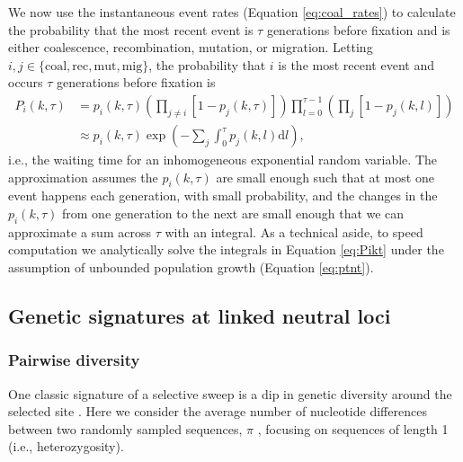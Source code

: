 \documentclass[]{article}
\begin{document}
We now use the instantaneous event rates (Equation \ref{eq:coal_rates}) to calculate the probability that the most recent event is $\tau$ generations before fixation and is either coalescence, recombination, mutation, or migration. 
Letting $i,j\in\{\mathrm{coal, rec, mut, mig}\}$, the probability that $i$ is the most recent event and occurs $\tau$ generations before fixation is \citep[c.f., equation 6 in][]{pennings2006soft}
\begin{equation}\label{eq:Pikt}
\begin{aligned}
P_i(k,\tau) &= p_{i}(k,\tau) \left( \prod_{j\neq i} [1 - p_{j}(k,\tau)] \right) \prod_{l=0}^{\tau-1} \left( \prod_{j} [1 - p_{j}(k,l)] \right)\\
&\approx p_{i}(k,\tau) \exp \left( -\sum_{j} \int_{0}^{\tau} p_{j}(k,l) \mathrm{d}l \right),
\end{aligned}
\end{equation}
i.e., the waiting time for an inhomogeneous exponential random variable.
The approximation assumes the $p_i(k,\tau)$ are small enough such that at most one event happens each generation, with small probability, and the changes in the $p_i(k,\tau)$ from one generation to the next are small enough that we can approximate a sum across $\tau$ with an integral.
As a technical aside, to speed computation we analytically solve the integrals in Equation \ref{eq:Pikt} under the assumption of unbounded population growth (Equation \ref{eq:ptnt}).

\subsection*{Genetic signatures at linked neutral loci}
\label{sec:rescue_signatures}

\subsubsection*{Pairwise diversity}
\label{sec:rescue_heterozygosity}

One classic signature of a selective sweep is a dip in genetic diversity around the selected site \citep{smith1974hitch,kaplan1989hitchhiking}. 
Here we consider the average number of nucleotide differences between two randomly sampled sequences, $\pi$ \citep{tajima1983evolutionary}, focusing on sequences of length 1 (i.e., heterozygosity).
\end{document}
